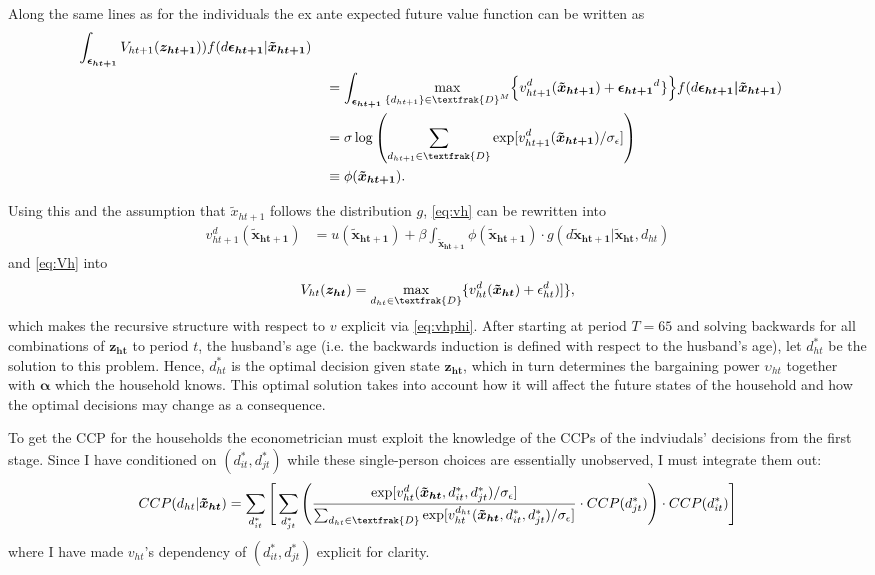 Along the same lines as for the individuals the ex ante expected future value function can be written as
\begin{alignat*}{3}
\int_{\boldsymbol{\epsilon_{ht+1}}}{ V_{ht+1}(\boldsymbol{z_{ht+1}}))f(d\boldsymbol{\epsilon_{ht+1}}|\boldsymbol{\tilde{x}_{ht+1}})} \\
& &&= \int_{\boldsymbol{\epsilon_{ht+1}}}{ \max_{\{d_{ht+1}\}\in \textfrak{D}^M_{}} } \Big\{v_{ht+1}^{d_{}}(\boldsymbol{\tilde{x}_{ht+1}}) +\boldsymbol{\epsilon_{ht+1}}^{d_{}}\} \Big\}f(d\boldsymbol{\epsilon_{ht+1}|\tilde{x}_{ht+1}}) \\
& &&=\sigma \log {\left( \sum_{d_{ht+1} \in \textfrak{D}} { \exp[v_{ht+1}^{d_{}}(\boldsymbol{\tilde{x}_{ht+1}})/ \sigma_{\epsilon}]  } \right)} \\
& &&\equiv\phi(\boldsymbol{\tilde{x}_{ht+1}}). 
\end{alignat*}


Using this and the assumption that $\tilde{x}_{ht+1}$ follows the distribution $g$, \eqref{eq:vh} can be rewritten into
\begin{align}
v_{ht+1}^d(\boldsymbol{\tilde{x}_{ht+1}})&=u(\boldsymbol{\tilde{x}_{ht+1}}) +\beta \int_{\boldsymbol{\tilde{x}_{ht+1}}}{\phi(\boldsymbol{\tilde{x}_{ht+1}})\cdot g(d\boldsymbol{\tilde{x}_{ht+1}}|\boldsymbol{\tilde{x}_{ht}},d_{ht})}  
\label{eq:vhphi}
\end{align}
and \eqref{eq:Vh} into
\begin{align}
V_{ht}(\boldsymbol{z_{ht}})=\max_{d_{ht}\in \textfrak{D}} \{v_{ht}^d(\boldsymbol{\tilde{x}_{ht}})+\epsilon_{ht}^d)]\},
\label{eq:Vhphi}
\end{align}
which makes the recursive structure with respect to $v$ explicit via \eqref{eq:vhphi}. After starting at period $T=65$ and solving backwards for all combinations of $\boldsymbol{z_{ht}}$ to period $t$, the husband's age (i.e. the backwards induction is defined with respect to the husband's age), let $d_{ht}^*$ be the solution to this problem. Hence, $d_{ht}^*$ is the optimal decision given state $\boldsymbol{z_{ht}}$, which in turn determines the bargaining power $\upsilon_{ht}$ together with $\boldsymbol{\alpha}$ which the household knows. This optimal solution takes into account how it will affect the future states of the household and how the optimal decisions may change as a consequence. 

To get the CCP for the households the econometrician must exploit the knowledge of the CCPs of the indviudals' decisions from the first stage. Since I have conditioned on $(d_{it}^*,d_{jt}^*)$ while these single-person choices are essentially unobserved, I must integrate them out: 
\begin{align*}
CCP(d_{ht}|\boldsymbol{\tilde{x}_{ht}})=\sum_{d_{it}^*}{\Bigg[\sum_{d_{jt}^*}{\Bigg(\frac{\exp[v_{ht}^{d}(\boldsymbol{\tilde{x}_{ht}},d_{it}^*,d_{jt}^*)/ \sigma_{\epsilon}]}{\sum_{d_{ht} \in \textfrak{D}} { \exp[v_{ht}^{d_{ht}}(\boldsymbol{\tilde{x}_{ht}},d_{it}^*,d_{jt}^*)/ \sigma_{\epsilon}]  }} \cdot CCP(d_{jt}^*)\Bigg)  }\cdot CCP(d_{it}^*)\Bigg]}
\end{align*}
where I have made $v_{ht}$'s dependency of $(d_{it}^*,d_{jt}^*)$ explicit for clarity.


